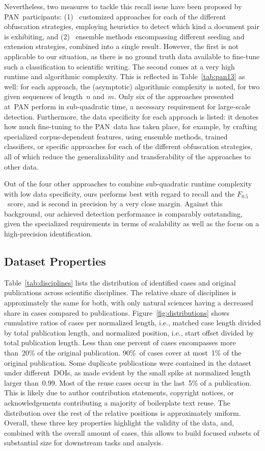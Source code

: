 \documentclass[fleqn,10pt]{wlscirep}
\newcommand{\Ni}{(1)~}
\newcommand{\Nii}{(2)~}
\begin{document}
Nevertheless, two measures to tackle this recall issue have been proposed by PAN~participants:
\Ni
customized approaches for each of the different obfuscation strategies, employing heuristics to detect which kind a document pair is exhibiting, and
\Nii
ensemble methods encompassing different seeding and extension strategies, combined into a single result.
However, the first is not applicable to our situation, as there is no ground truth data available to fine-tune such a classification to scientific writing. The second comes at a very high runtime and algorithmic complexity.
This is reflected in Table~\ref{tab:pan13} as well: for each approach, the (asymptotic) algorithmic complexity is noted, for two given sequences of length~$n$ and~$m$. Only six of the approaches presented at~PAN perform in sub-quadratic time, a necessary requirement for large-scale detection. Furthermore, the data specificity for each approach is listed: it denotes how much fine-tuning to the PAN~data has taken place, for example, by crafting specialized corpus-dependent features, using ensemble methods, trained classifiers, or specific approaches for each of the different obfuscation strategies, all of which reduce the generalizability and transferability of the approaches to other data. 

Out of the four other approaches to combine sub-quadratic runtime complexity with low data specificity, ours performs best with regard to recall and the $F_{0.5}$~score, and is second in precision by a very close margin. Against this background, our achieved detection performance is comparably outstanding, given the specialized requirements in terms of scalability as well as the focus on a high-precision identification.


\subsection*{Dataset Properties}

Table~\ref{tab:disciplines} lists the distribution of identified cases and original publications across scientific disciplines. The relative share of disciplines is approximately the same for both, with only natural sciences having a decreased share in cases compared to publications. Figure~\ref{fig:distributions} shows cumulative ratios of cases per normalized length, i.e., matched case length divided by total publication length, and normalized position, i.e., start offset divided by total publication length. Less than one percent of cases encompasses more than~20\% of the original publication. 90\%~of cases cover at most~1\% of the original publication. Some duplicate publications were contained in the dataset under different~DOIs, as made evident by the small spike at normalized length larger than~0.99. Most of the reuse cases occur in the last~5\% of a publication. This is likely due to author contribution statements, copyright notices, or acknowledgements contributing a majority of boilerplate text reuse. The distribution over the rest of the relative positions is approximately uniform. Overall, these three key properties highlight the validity of the data, and, combined with the overall amount of cases, this allows to build focused subsets of substantial size for downstream tasks and analysis.
\end{document}
